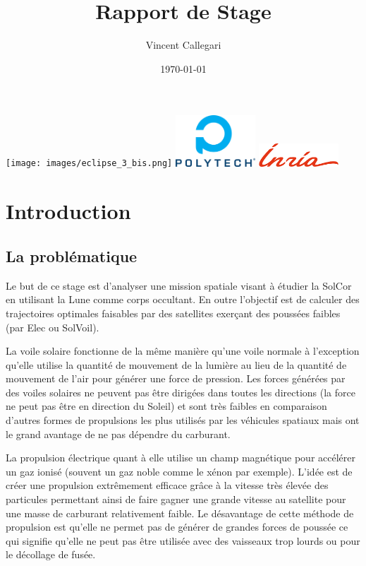 \documentclass[11pt]{article} %
\title{Rapport de Stage} %
\author{Vincent Callegari} %
\date{\today} %
\begin{document}
		\maketitle
		\hspace*{-0.1375\textwidth}
		\texttt{[image: images/eclipse\_3\_bis.png]}
		\vfill
		\includegraphics[width=3cm]{images/Logo_Reseau_Polytech.png} \hfill \includegraphics[width=3cm]{images/inria.png}
		\newpage
		\tableofcontents
		\newpage
		\section{Introduction}
		
		\subsection{La problématique}
		Le but de ce stage est d'analyser une mission spatiale visant à étudier la \gls{SolCor} en utilisant la Lune comme corps occultant. En outre l'objectif est de calculer des trajectoires optimales faisables par des satellites exerçant des poussées faibles (par \gls{Elec} ou \gls{SolVoil}).
		
		La voile solaire fonctionne de la même manière qu'une voile normale à l'exception qu'elle utilise la quantité de mouvement de la lumière au lieu de la quantité de mouvement de l'air pour générer une force de pression. Les forces générées par des voiles solaires ne peuvent pas être dirigées dans toutes les directions (la force ne peut pas être en direction du Soleil) et sont très faibles en comparaison d'autres formes de propulsions les plus utilisés par les véhicules spatiaux mais ont le grand avantage de ne pas dépendre du carburant.
		
		La propulsion électrique quant à elle utilise un champ magnétique pour accélérer un gaz ionisé (souvent un gaz noble comme le xénon par exemple). L'idée est de créer une propulsion extrêmement efficace grâce à la vitesse très élevée des particules permettant ainsi de faire gagner une grande vitesse au satellite pour une masse de carburant relativement faible. Le désavantage de cette méthode de propulsion est qu'elle ne permet pas de générer de grandes forces de poussée ce qui signifie qu'elle ne peut pas être utilisée avec des vaisseaux trop lourds ou pour le décollage de fusée.
		
\end{document}
